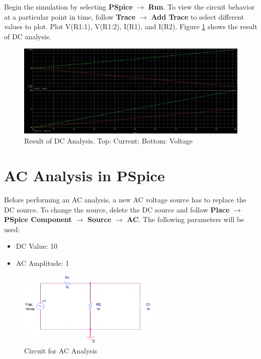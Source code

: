 \documentclass[12pt]{../manual}
\begin{document}
\newpage
Begin the simulation by selecting \textbf{PSpice} $\to$ \textbf{Run}. To view the circuit behavior at a particular point in time, follow \textbf{Trace} $\to$ \textbf{Add Trace} to select different values to plot. Plot V(R1:1), V(R1:2), I(R1), and I(R2). Figure \ref{fig:dcAnalRes} shows the result of DC analysis.

\begin{figure}[ht!]
\begin{center}
\includegraphics[width=\textwidth]{figures/ResultDCAnalysisCrop.PNG}
\caption[Result of DC Analysis]{Result of DC Analysis. Top: Current; Bottom: Voltage}
\label{fig:dcAnalRes}
\end{center}
\end{figure}
%
\newpage
\section{AC Analysis in PSpice}
Before performing an AC analysis, a new AC voltage source has to replace the DC source. To change the source, delete the DC source and follow \textbf{Place} $\to$ \textbf{PSpice Component} $\to$ \textbf{Source} $\to$ \textbf{AC}. The following parameters will be used:
\begin{itemize}
\item DC Value: 10
\item AC Amplitude: 1
\end{itemize}

\begin{figure}[ht!]
	\begin{center}
		\includegraphics[width=0.6\textwidth]{figures/ACAnalysisCircuitCrop.PNG}
	\end{center}
	\caption{Circuit for AC Analysis}
	\label{fig:ac}
\end{figure}
\end{document}

